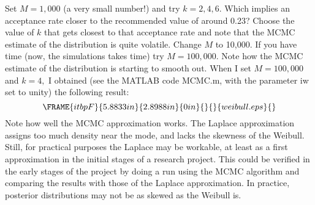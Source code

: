 \documentclass[12pt,thmsa]{article}
\begin{document}
\begin{enumerate}
Set $M=1,000$ (a very small number!) and try $k=2,4,6.$ Which implies an
acceptance rate closer to the recommended value of around 0.23? Choose the
value of $k$ that gets closest to that acceptance rate and note that the
MCMC estimate of the distribution is quite volatile. Change $M$ to 10,000.
If you have time (now, the simulations takes time) try $M=100,000.$ Note how
the MCMC estimate of the distribution is starting to smooth out. When I set $%
M=100,000$ and $k=4,$ I obtained (see the MATLAB code MCMC.m, with the
parameter iw set to unity) the following result:%
\begin{equation*}
\end{equation*}%
\begin{equation*}
\FRAME{itbpF}{5.8833in}{2.8988in}{0in}{}{}{weibull.eps}{\special{language
"Scientific Word";type "GRAPHIC";maintain-aspect-ratio TRUE;display
"USEDEF";valid_file "F";width 5.8833in;height 2.8988in;depth
0in;original-width 16.6139in;original-height 8.1448in;cropleft "0";croptop
"1";cropright "1";cropbottom "0";filename 'weibull.eps';file-properties
"XNPEU";}}
\end{equation*}%
\begin{equation*}
\end{equation*}%
Note how well the MCMC approximation works. The Laplace approximation
assigns too much density near the mode, and lacks the skewness of the
Weibull. Still, for practical purposes the Laplace may be workable, at least
as a first approximation in the initial stages of a research project. This
could be verified in the early stages of the project by doing a run using
the MCMC algorithm and comparing the results with those of the Laplace
approximation. In practice, posterior distributions may not be as skewed as
the Weibull is.


\end{enumerate}
\end{document}
